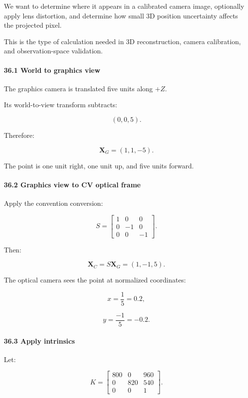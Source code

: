 We want to determine where it appears in a calibrated camera image, optionally apply lens distortion, and determine how small 3D position uncertainty affects the projected pixel.

This is the type of calculation needed in 3D reconstruction, camera calibration, and observation-space validation.

\paragraph{36.1 World to graphics view}\label{world-to-graphics-view}

The graphics camera is translated five units along \(+Z\).

Its world-to-view transform subtracts:

\[
 (0,0,5).
\]

Therefore:

\[
 \boxed{ \mathbf X_G=(1,1,-5) }.
\]

The point is one unit right, one unit up, and five units forward.

\paragraph{36.2 Graphics view to CV optical frame}\label{graphics-view-to-cv-optical-frame}

Apply the convention conversion:

\[
 S= \begin{bmatrix} 1&0&0\\ 0&-1&0\\ 0&0&-1 \end{bmatrix}.
\]

Then:

\[
 \boxed{ \mathbf X_C=S\mathbf X_G=(1,-1,5) }.
\]

The optical camera sees the point at normalized coordinates:

\[
 x=\frac15=0.2,
\]

\[
 y=\frac{-1}{5}=-0.2.
\]

\paragraph{36.3 Apply intrinsics}\label{apply-intrinsics}

Let:

\[
 K= \begin{bmatrix} 800&0&960\\ 0&820&540\\ 0&0&1 \end{bmatrix}.
\]

